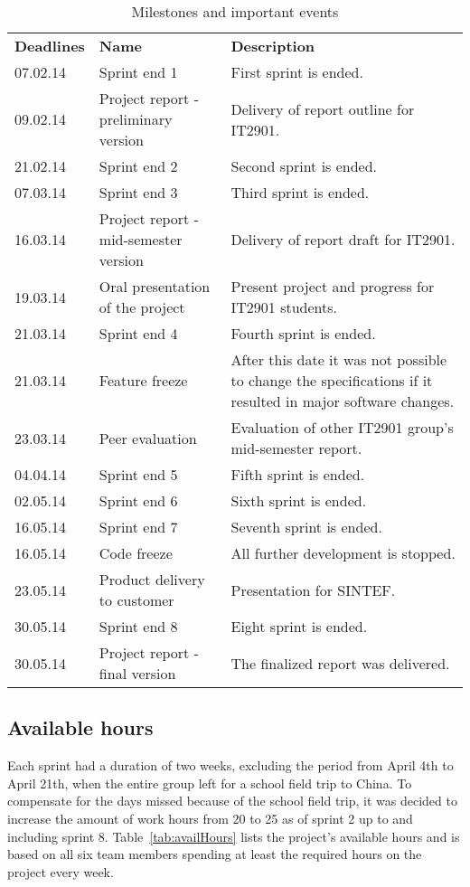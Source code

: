 \begin{table}[H]
\centering
{}
\begin{tabular}{|l|p{6.7cm}|p{6.5cm}|}
\hline
\textbf{Deadlines} & \textbf{Name} & \textbf{Description}\\
07.02.14 & Sprint end 1 & First sprint is ended. \\
09.02.14& Project report - preliminary version & Delivery of report outline for IT2901.\\
21.02.14& Sprint end 2 & Second sprint is ended. \\
07.03.14& Sprint end 3 & Third sprint is ended.\\
16.03.14& Project report - mid-semester version &  Delivery of report draft for IT2901. \\
19.03.14 & Oral presentation of the project & Present project and progress for IT2901 students.\\
21.03.14& Sprint end 4 & Fourth sprint is ended.\\
21.03.14 & Feature freeze & After this date it was not possible to change the specifications if it resulted in major software changes.\\
23.03.14 & Peer evaluation &  Evaluation of other IT2901 group's mid-semester report. \\
04.04.14& Sprint end 5 & Fifth sprint is ended.\\
02.05.14& Sprint end 6 & Sixth sprint is ended.\\
16.05.14& Sprint end 7 & Seventh sprint is ended.\\
16.05.14& Code freeze & All further development is stopped.\\
23.05.14& Product delivery to customer & Presentation for SINTEF.\\ 
30.05.14& Sprint end 8 & Eight sprint is ended.\\
30.05.14 & Project report - final version & The finalized report was delivered.\\\hline
\end{tabular}
\caption{Milestones and important events}
\label{tab:milestones}
\end{table}

\subsection{Available hours}

Each sprint had a duration of two weeks, excluding the period from April 4th to April 21th, when the entire group left for a school field trip to China. To compensate for the days missed because of the school field trip, it was decided to increase the amount of work hours from 20 to 25 as of sprint 2 up to and including sprint 8. Table~\ref{tab:availHours} lists the project's available hours and is based on all six team members spending at least the required hours on the project every week.

